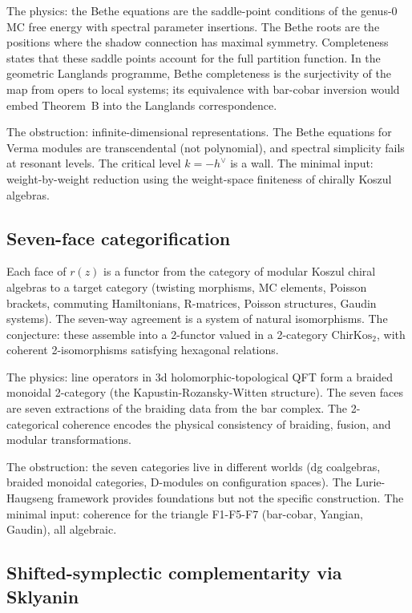 \documentclass[11pt]{article}
\begin{document}
The physics: the Bethe equations are the saddle-point conditions of the
genus-$0$ MC free energy with spectral parameter insertions.  The Bethe
roots are the positions where the shadow connection has maximal symmetry.
Completeness states that these saddle points account for the full
partition function.  In the geometric Langlands programme, Bethe
completeness is the surjectivity of the map from opers to local systems;
its equivalence with bar-cobar inversion would embed Theorem~B into the
Langlands correspondence.

The obstruction: infinite-dimensional representations.  The Bethe
equations for Verma modules are transcendental (not polynomial), and
spectral simplicity fails at resonant levels.  The critical level
$k = -h^\vee$ is a wall.  The minimal input: weight-by-weight reduction
using the weight-space finiteness of chirally Koszul algebras.

\subsection{Seven-face categorification}

Each face of $r(z)$ is a functor from the category of modular Koszul
chiral algebras to a target category (twisting morphisms, MC elements,
Poisson brackets, commuting Hamiltonians, R-matrices, Poisson
structures, Gaudin systems).  The seven-way agreement is a system of
natural isomorphisms.  The conjecture: these assemble into a 2-functor
valued in a 2-category $\mathrm{ChirKos}_2$, with coherent
2-isomorphisms satisfying hexagonal relations.

The physics: line operators in 3d holomorphic-topological QFT form a
braided monoidal 2-category (the Kapustin-Rozansky-Witten structure).
The seven faces are seven extractions of the braiding data from the bar
complex.  The 2-categorical coherence encodes the physical consistency
of braiding, fusion, and modular transformations.

The obstruction: the seven categories live in different worlds (dg
coalgebras, braided monoidal categories, D-modules on configuration
spaces).  The Lurie-Haugseng framework provides foundations but not the
specific construction.  The minimal input: coherence for the triangle
F1-F5-F7 (bar-cobar, Yangian, Gaudin), all algebraic.

\subsection{Shifted-symplectic complementarity via Sklyanin}
\end{document}
